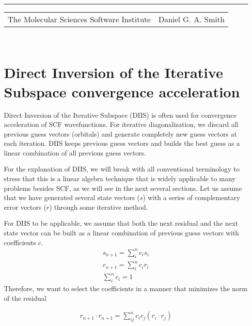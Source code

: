 \documentclass[aip,jcp,preprint,superscriptaddress,floatfix]{revtex4-1}
\renewcommand{\title}[1]{\textbf{\large{#1}}\\}
\newcommand{\leftright}[2]{\begin{tabularx}{\textwidth}{X>{\raggedleft}X}#1%
& #2\\\end{tabularx}\\[-1cm]}
\begin{document}
\title{}
\rule{\textwidth}{1pt}
\leftright{The Molecular Sciences Software Institute}{Daniel G. A. Smith} %

\bigskip

\section{Direct Inversion of the Iterative Subspace convergence acceleration}
Direct Inversion of the Iterative Subspace (DIIS) is often used for convergence acceleration\cite{Pulay:1980jn} of SCF wavefunctions.
For iterative diagonalization, we discard all previous guess vectors (orbitals) and generate completely new guess vectors at each iteration.
DIIS keeps previous guess vectors and builds the best guess as a linear combination of all previous guess vectors.

For the explanation of DIIS, we will break with all conventional terminology to stress that this is a linear algebra technique that is widely applicable to many problems besides SCF, as we will see in the next several sections.
Let us assume that we have generated several state vectors ($s$) with a series of complementary error vectors ($r$) through some iterative method.

For DIIS to be applicable, we assume that both the next residual and the next state vector can be built as a linear combination of previous guess vectors with coefficients $c$.
\begin{eqnarray}
\label{diis_truths} 
s_{n+1} = \sum_{i}^{n} c_is_i\\
r_{n+1} = \sum_{i}^{n} c_ir_i\\
\sum_{i}^{n} c_i = 1
\end{eqnarray}
Therefore, we want to select the coefficients in a manner that minimizes the norm of the residual

\begin{eqnarray}
\label{diis_min} 
r_{n+1}\cdot r_{n+1} = \sum_{ij}^{n}c_ic_j(r_i \cdot r_j)
\end{eqnarray}
\end{document}
